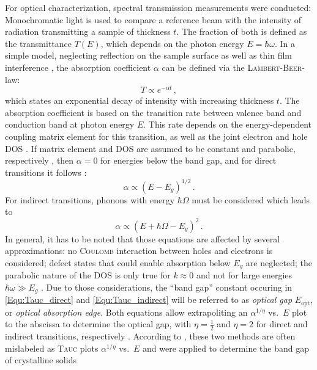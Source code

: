 For optical characterization, spectral transmission measurements were conducted:
Mo\-no\-chro\-ma\-tic light is used to compare a reference beam with the intensity of radiation transmitting a sample of thickness $t$.
The fraction of both is defined as the transmittance $T(E)$, which depends on the photon energy $E=\hbar\omega$.
In a simple model, neglecting reflection on the sample surface as well as thin film interference
    \cite{manifacier1977},
the absorption coefficient $\alpha$ can be defined via the \textsc{Lambert}-\textsc{Beer}-law:
\begin{equation}
    T\propto e^{-\alpha t}\,,
\end{equation}
which states an exponential decay of intensity with increasing thickness $t$.
The absorption coefficient is based on the transition rate between valence band and conduction band at photon energy $E$.
This rate depends on the energy-dependent coupling matrix element for this transition, as well as the joint electron and hole \gls{DOS}
    \cite{zanatta2019}.
If matrix element and \gls{DOS} are assumed to be constant and parabolic, respectively
    \cite{tauc2005},
then $\alpha=0$ for energies below the band gap, and for direct transitions it follows \cite{zanatta2019}:
\begin{equation}
    \alpha\propto (E-E_g)^{1/2}\,.
    \label{Equ:Tauc_direct}
\end{equation}
For indirect transitions, phonons with energy $\hbar\Omega$ must be considered which leads to
\begin{equation}
    \alpha\propto (E+\hbar\Omega-E_g)^2\,.
    \label{Equ:Tauc_indirect}
\end{equation}
In general, it has to be noted that those equations are affected by several approximations:
    no \textsc{Coulomb} interaction between holes and electrons is considered;
    defect states that could enable absorption below $E_g$ are neglected;
    the parabolic nature of the \gls{DOS} is only true for $k\approx0$ and not for large energies $\hbar\omega\gg E_g$
    \cite{zanatta2019}.
Due to those considerations, the \enquote{band gap} constant occuring in \eqref{Equ:Tauc_direct} and \eqref{Equ:Tauc_indirect} will be referred to as \emph{optical gap} $E_\mathrm{opt}$, or \emph{optical absorption edge}.
Both equations allow extrapoliting an $\alpha^{1/\eta}$ vs.\ $E$ plot to the abscissa to determine the optical gap, with $\eta=\frac{1}{2}$ and $\eta=2$ for direct and indirect transitions, respectively
    \cite{zanatta2019}.
According to \textcite{zanatta2019}, these two methods are often mislabeled as \textsc{Tauc} plots $\alpha^{1/\eta}$ vs.\ $E$ and were applied to determine the band gap of crystalline solids
